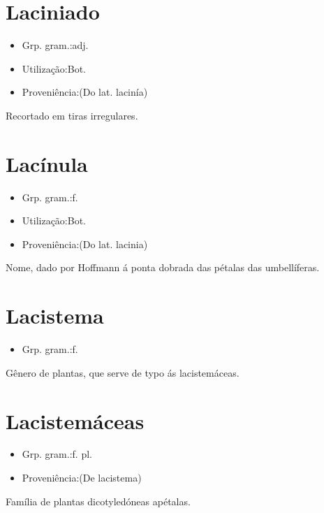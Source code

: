 \section{Laciniado}
\begin{itemize}
\item {Grp. gram.:adj.}
\end{itemize}
\begin{itemize}
\item {Utilização:Bot.}
\end{itemize}
\begin{itemize}
\item {Proveniência:(Do lat. \textunderscore lacinía\textunderscore )}
\end{itemize}
Recortado em tiras irregulares.
\section{Lacínula}
\begin{itemize}
\item {Grp. gram.:f.}
\end{itemize}
\begin{itemize}
\item {Utilização:Bot.}
\end{itemize}
\begin{itemize}
\item {Proveniência:(Do lat. \textunderscore lacinia\textunderscore )}
\end{itemize}
Nome, dado por Hoffmann á ponta dobrada das pétalas das umbellíferas.
\section{Lacistema}
\begin{itemize}
\item {Grp. gram.:f.}
\end{itemize}
Gênero de plantas, que serve de typo ás lacistemáceas.
\section{Lacistemáceas}
\begin{itemize}
\item {Grp. gram.:f. pl.}
\end{itemize}
\begin{itemize}
\item {Proveniência:(De \textunderscore lacistema\textunderscore )}
\end{itemize}
Família de plantas dicotyledóneas apétalas.
